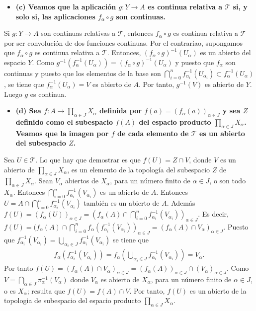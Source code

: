 \documentclass{article}
\begin{document}
\begin{itemize}
\item \bf (c) \rm Veamos que la aplicación $g:Y\rightarrow A$ es continua relativa a $\mathcal{T}$ si, y solo si, las aplicaciones $f_\alpha\circ g$ son continuas.
\end{itemize}
Si $g:Y\rightarrow A$ son continuas relativas a $\mathcal{T}$, entonces $f_\alpha\circ g$ es continua relativa a $\mathcal{T}$ por ser convolución de dos funciones continuas. Por el contrariao, supongamos que $f_\alpha\circ g$ es continua relativa a $\mathcal{T}$. Entonces, $(f_\alpha\circ g)^{-1}(U_\alpha)$ es un abierto del espacio $Y$. Como $g^{-1}(f_\alpha^{-1}(U_\alpha))=(f_\alpha\circ g)^{-1}(U_\alpha)$ y puesto que $f_\alpha$ son continuas y puesto que los elementos de la base son $\bigcap_{i=0}^{n}f_{\alpha_i}^{-1}(U_{\alpha_i})\subset f_\alpha^{-1}(U_\alpha)$, se tiene que $f_\alpha^{-1}(U_\alpha)=V$ es abierto de $A$. Por tanto, $g^{-1}(V)$ es abierto de $Y$. Luego $g$ es continua.
\begin{itemize}
\item \bf (d) \rm Sea $f:A\rightarrow \prod_{\alpha\in J}X_\alpha$ definida por $f(a)=(f_\alpha(a))_{\alpha\in J}$ y sea $Z$ definido como el subespacio $f(A)$ del espacio producto $\prod_{\alpha\in J}X_\alpha$. Veamos que la imagen por $f$ de cada elemento de $\mathcal{T}$ es un abierto del subespacio $Z$.
\end{itemize}
Sea $U\in \mathcal{T}$. Lo que hay que demostrar es que $f(U)=Z\cap V$, donde $V$ es un abierto de $\prod_{\alpha\in J}X_\alpha$, es un elemento de la topología del subespacio $Z$ de $\prod_{\alpha\in J}X_\alpha$. Sean $V_\alpha$ abiertos de $X_\alpha$, para un número finito de $\alpha\in J$, o son todo $X_\alpha$. Entonces $\bigcap_{i=0}^n f^{-1}_{\alpha_i}(V_{\alpha_i})$ es un abierto de $A$. Entonces $U=A\cap\bigcap_{i=0}^n f^{-1}_{\alpha_i}(V_{\alpha_i})$ también es un abierto de $A$. Además $f(U)=(f_\alpha(U))_{\alpha\in J}=\left(f_\alpha(A)\cap \bigcap_{i=0}^n f^{-1}_{\alpha_i}(V_{\alpha_i})\right)_{\alpha\in J}$. Es decir, $f(U)=(f_\alpha(A)\cap \bigcap_{i=0}^n f_\alpha(f^{-1}_{\alpha_i}(V_{\alpha_i}))_{\alpha\in J}=(f_\alpha(A)\cap V_\alpha)_{\alpha\in J}$. Puesto que $f^{-1}_{\alpha_i}(V_{\alpha_i})=\bigcup_{\alpha_i\in J}f^{-1}_{\alpha_i}(V_{\alpha_i})$ se tiene que \begin{eqnarray}
f_\alpha(f^{-1}_{\alpha_i}(V_{\alpha_i}))=f_\alpha(\bigcup_{\alpha_i\in J}f^{-1}_{\alpha_i}(V_{\alpha_i}))=V_\alpha\nonumber.
\end{eqnarray}
Por tanto $f(U)=(f_\alpha(A)\cap V_\alpha)_{\alpha\in J}=(f_\alpha(A))_{\alpha\in J}\cap (V_\alpha)_{\alpha\in J}$. Como $V=\bigcap_{\alpha\in J}\pi^{-1}_{\alpha}(V_\alpha)$ donde $V_\alpha$ es abierto de $X_\alpha$, para un número finito de $\alpha\in J$, o es $X_\alpha$; resulta que $f(U)=f(A)\cap V$. Por tanto, $f(U)$ es un abierto de la topologia de subespacio del espacio producto $\prod_{\alpha\in J}X_\alpha$.
\end{document}
